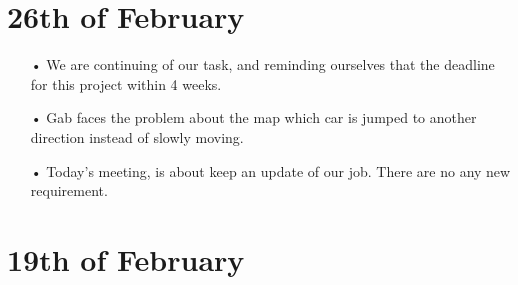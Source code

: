 \documentclass[11pt]{article}
\begin{document}
\section{26th of February}
\begin{itemize}
\item[•] We are continuing of our task, and reminding ourselves that the deadline for this project within 4 weeks. 
\item[•] Gab faces the problem about the map which car is jumped to another direction instead of slowly moving. 
\item[•] Today's meeting, is about keep an update of our job. There are no any new requirement. 

\end{itemize}

\section{19th of February}
\end{document}
